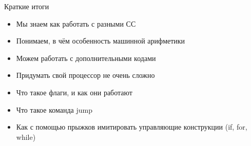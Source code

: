 \documentclass{beamer}
\begin{document}
    \begin{frame}{Краткие итоги}
        \begin{itemize}
            \item Мы знаем как работать с разными СС
            \item Понимаем, в чём особенность машинной арифметики
            \item Можем работать с дополнительными кодами
            \item Придумать свой процессор не очень сложно
            \item Что такое флаги, и как они работают
            \item Что такое команда jump
            \item Как с помощью прыжков имитировать управляющие конструкции (if, for, while)
        \end{itemize}
    \end{frame}
\end{document}
